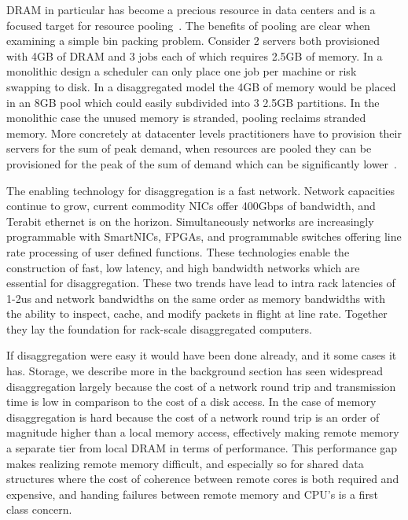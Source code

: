 \documentclass[12pt]{ucsddissertation}
\begin{document}
\begin{dissertationintroduction}
DRAM in particular has become a precious resource in data centers and is a focused target for
resource pooling~\cite{micron-memorywall}. The benefits of pooling are clear when examining a
simple bin packing problem. Consider 2 servers both provisioned with 4GB of DRAM and 3 jobs each of
which requires 2.5GB of memory. In a monolithic design a scheduler can only place one job per
machine or risk swapping to disk. In a disaggregated model the 4GB of memory would be placed in an
8GB pool which could easily subdivided into 3 2.5GB partitions. In the monolithic case the unused
memory is stranded, pooling reclaims stranded memory.  More concretely at datacenter levels
practitioners have to provision their servers for the sum of peak demand, when resources are pooled
they can be provisioned for the peak of the sum of demand which can be significantly
lower~\cite{supernic, dsnf}.

The enabling technology for disaggregation is a fast network. Network capacities continue to grow,
current commodity NICs offer 400Gbps of bandwidth, and Terabit ethernet is on the horizon.
Simultaneously networks are increasingly programmable with SmartNICs, FPGAs, and programmable
switches offering line rate processing of user defined functions. These technologies enable the
construction of fast, low latency, and high bandwidth networks which are essential for
disaggregation. These two trends have lead to intra rack latencies of 1-2us and network bandwidths
on the same order as memory bandwidths with the ability to inspect, cache, and modify packets in
flight at line rate. Together they lay the foundation for rack-scale disaggregated computers.

If disaggregation were easy it would have been done already, and it some cases it has. Storage, we
describe more in the background section has seen widespread disaggregation largely because the cost
of a network round trip and transmission time is low in comparison to the cost of a disk access. In
the case of memory disaggregation is hard because the cost of a network round trip is an order of
magnitude higher than a local memory access, effectively making remote memory a separate tier from
local DRAM in terms of performance. This performance gap makes realizing remote memory difficult,
and especially so for shared data structures where the cost of coherence between remote cores is
both required and expensive, and handing failures between remote memory and CPU's is a first class
concern.


\end{dissertationintroduction}
\end{document}
